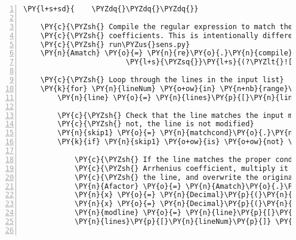 \begin{Verbatim}[commandchars=\\\{\},fontsize=\small,numbers=left,firstnumber=1,stepnumber=2,firstline=2]
\PY{l+s+sd}{    \PYZdq{}\PYZdq{}\PYZdq{}}

    \PY{c}{\PYZsh{} Compile the regular expression to match the Arrhenius}
    \PY{c}{\PYZsh{} coefficients. This is intentionally different from the Amatch in}
    \PY{c}{\PYZsh{} run\PYZus{}sens.py}
    \PY{n}{Amatch} \PY{o}{=} \PY{n}{re}\PY{o}{.}\PY{n}{compile}\PY{p}{(}\PY{l+s}{r\PYZsq{}}\PY{l+s}{(([\PYZhy{}+]?[0\PYZhy{}9]+(}\PY{l+s}{\PYZbs{}}\PY{l+s}{.[0\PYZhy{}9]+)?[eE][\PYZhy{}+]?[0\PYZhy{}9]+)|}\PY{l+s}{\PYZsq{}}
                        \PY{l+s}{\PYZsq{}}\PY{l+s}{(?\PYZlt{}![}\PY{l+s}{\PYZbs{}}\PY{l+s}{d}\PY{l+s}{\PYZbs{}}\PY{l+s}{.])([0]+}\PY{l+s}{\PYZbs{}}\PY{l+s}{.?[0]+)(?![}\PY{l+s}{\PYZbs{}}\PY{l+s}{d]))}\PY{l+s}{\PYZsq{}}\PY{p}{)}

    \PY{c}{\PYZsh{} Loop through the lines in the input list}
    \PY{k}{for} \PY{n}{lineNum} \PY{o+ow}{in} \PY{n+nb}{range}\PY{p}{(}\PY{n+nb}{len}\PY{p}{(}\PY{n}{lines}\PY{p}{)}\PY{p}{)}\PY{p}{:}
        \PY{n}{line} \PY{o}{=} \PY{n}{lines}\PY{p}{[}\PY{n}{lineNum}\PY{p}{]}

        \PY{c}{\PYZsh{} Check that the line matches the input matching condition. If}
        \PY{c}{\PYZsh{} not, the line is not modified}
        \PY{n}{skip1} \PY{o}{=} \PY{n}{matchcond}\PY{o}{.}\PY{n}{search}\PY{p}{(}\PY{n}{line}\PY{p}{)}
        \PY{k}{if} \PY{n}{skip1} \PY{o+ow}{is} \PY{o+ow}{not} \PY{n+nb+bp}{None}\PY{p}{:}

            \PY{c}{\PYZsh{} If the line matches the proper condition, find the}
            \PY{c}{\PYZsh{} Arrhenius coefficient, multiply it by two, reconstruct}
            \PY{c}{\PYZsh{} the line, and overwrite the original line in the input list.}
            \PY{n}{Afactor} \PY{o}{=} \PY{n}{Amatch}\PY{o}{.}\PY{n}{search}\PY{p}{(}\PY{n}{line}\PY{p}{)}
            \PY{n}{x} \PY{o}{=} \PY{n}{Decimal}\PY{p}{(}\PY{n}{Afactor}\PY{o}{.}\PY{n}{group}\PY{p}{(}\PY{l+m+mi}{1}\PY{p}{)}\PY{p}{)}
            \PY{n}{x} \PY{o}{=} \PY{n}{Decimal}\PY{p}{(}\PY{n}{rfac}\PY{p}{)} \PY{o}{*} \PY{n}{x}
            \PY{n}{modline} \PY{o}{=} \PY{n}{line}\PY{p}{[}\PY{p}{:}\PY{n}{Afactor}\PY{o}{.}\PY{n}{start}\PY{p}{(}\PY{p}{)}\PY{p}{]} \PY{o}{+} \PY{n+nb}{str}\PY{p}{(}\PY{n}{x}\PY{p}{)} \PY{o}{+} \PY{n}{line}\PY{p}{[}\PY{n}{Afactor}\PY{o}{.}\PY{n}{end}\PY{p}{(}\PY{p}{)}\PY{p}{:}\PY{p}{]}
            \PY{n}{lines}\PY{p}{[}\PY{n}{lineNum}\PY{p}{]} \PY{o}{=} \PY{n}{modline}


\end{Verbatim}
